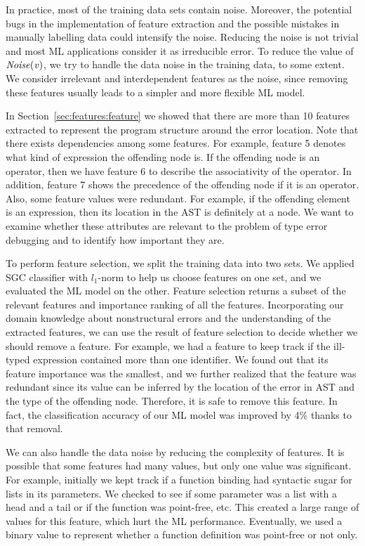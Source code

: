 \documentclass[12pt]{report}	%
\begin{document}
In practice, most of the training data sets contain noise.
Moreover, the potential bugs in the implementation of feature extraction
and the possible mistakes in manually labelling data
could intensify the noise.
Reducing the noise is not trivial and most ML applications
consider it as irreducible error.
To reduce the value of $\it{Noise}(v)$,
we try to handle the data noise in the training data, to some extent.
We consider irrelevant and interdependent features as the noise, 
since removing these features
usually leads to a simpler and more flexible ML model.

In Section~\ref{sec:features:feature} we showed that there are more than 10
features extracted to represent the program structure around
the error location. Note that there  exists
dependencies among some features.
For example, feature 5 denotes what kind of expression the offending node is.
If the offending node is an operator, then we have feature 6 to describe
the associativity of the operator.
In addition, feature 7 shows the precedence of the offending node if
it is an operator.
Also, some feature values were redundant.
For example, if the offending element is an expression, then
its location in the AST is definitely at a node.
We want to examine whether these attributes are
relevant to the problem of type error debugging and
to identify how important they are.

To perform feature selection, we split
the training data into two sets.
We applied SGC classifier with $l_{1}$-norm \cite{Kearns:1994:ICL:200548}
to help us choose features on one set,
and we evaluated the ML model on the other.
%
Feature selection returns a subset of the relevant features
and importance ranking of all the features.
Incorporating our domain knowledge about nonstructural
errors and the understanding of the extracted features,
we can use the result of feature selection to decide
whether we should remove a feature.
For example,
we had a feature to keep track if the ill-typed
expression contained more than one identifier.
We found out that its feature importance was the smallest,
and we further realized that the feature was redundant since
its value can be inferred by the location of the error in AST
and the type of the offending node.
Therefore, it is safe to remove this feature.
In fact, the classification accuracy of our ML model
was improved by 4\% thanks to that removal.

We can also handle the data noise
by reducing the complexity of features.
It is possible that some features had many values,
but only one value was significant.
%
For example, initially we kept track if a function binding had syntactic sugar for lists 
in its parameters. We checked to see if some parameter was 
a list with a head and a tail
or if the function was point-free, etc. 
This created a large range of values
for this feature, which hurt the ML performance.
Eventually, we used a binary value to represent
whether a function definition was point-free or not only.
\end{document}
